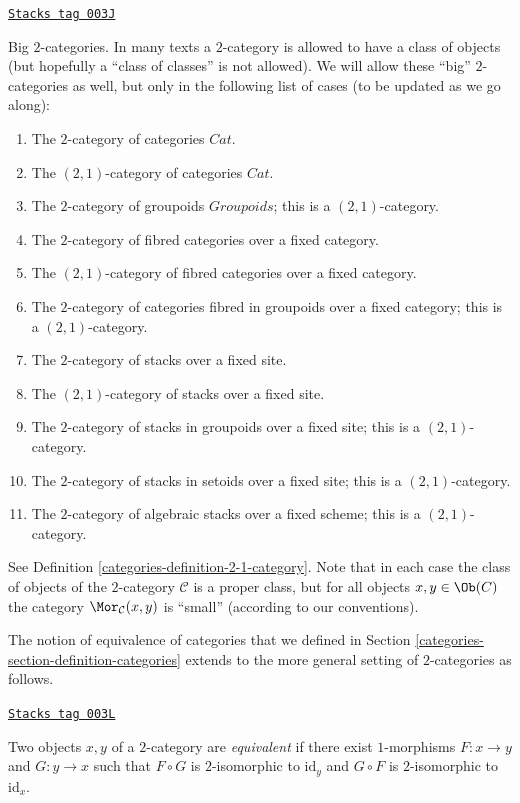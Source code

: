 \begin{remark}
\label{categories-remark-big-2-categories}
\href{https://stacks.math.columbia.edu/tag/003J}{\texttt{Stacks tag 003J}}

Big $2$-categories.
In many texts a $2$-category is allowed to have a class of
objects (but hopefully a ``class of classes'' is not allowed).
We will allow these ``big'' $2$-categories as well, but only
in the following list of cases (to be updated as we go along):
\begin{enumerate}
\item The $2$-category of categories $\textit{Cat}$.
\item The $(2, 1)$-category of categories $\textit{Cat}$.
\item The $2$-category of groupoids $\textit{Groupoids}$;
this is a $(2, 1)$-category.
\item The $2$-category of fibred categories over a fixed category.
\item The $(2, 1)$-category of fibred categories over a fixed category.
\item The $2$-category of categories fibred in groupoids over a fixed category;
this is a $(2, 1)$-category.
\item The $2$-category of stacks over a fixed site.
\item The $(2, 1)$-category of stacks over a fixed site.
\item The $2$-category of stacks in groupoids over a fixed site;
this is a $(2, 1)$-category.
\item The $2$-category of stacks in setoids over a fixed site;
this is a $(2, 1)$-category.
\item The $2$-category of algebraic stacks over a fixed scheme;
this is a $(2, 1)$-category.
\end{enumerate}
See Definition \ref{categories-definition-2-1-category}.
Note that in each case the class of objects of the $2$-category
$\mathcal{C}$ is a proper class, but for all objects $x, y \in \Ob(C)$
the category $\Mor_\mathcal{C}(x, y)$ is ``small'' (according to
our conventions).
\end{remark}

The notion of equivalence of categories that we defined in Section
\ref{categories-section-definition-categories} extends to the more general setting of
$2$-categories as follows.

\begin{definition}[Equivalence]
\label{categories-definition-equivalence}
\href{https://stacks.math.columbia.edu/tag/003L}{\texttt{Stacks tag 003L}}

Two objects $x, y$ of a $2$-category are {\it equivalent} if there exist
$1$-morphisms $F : x \to y$ and $G : y \to x$ such that $F \circ G$ is
$2$-isomorphic to $\text{id}_y$ and $G \circ F$ is $2$-isomorphic to
$\text{id}_x$.
\end{definition}


